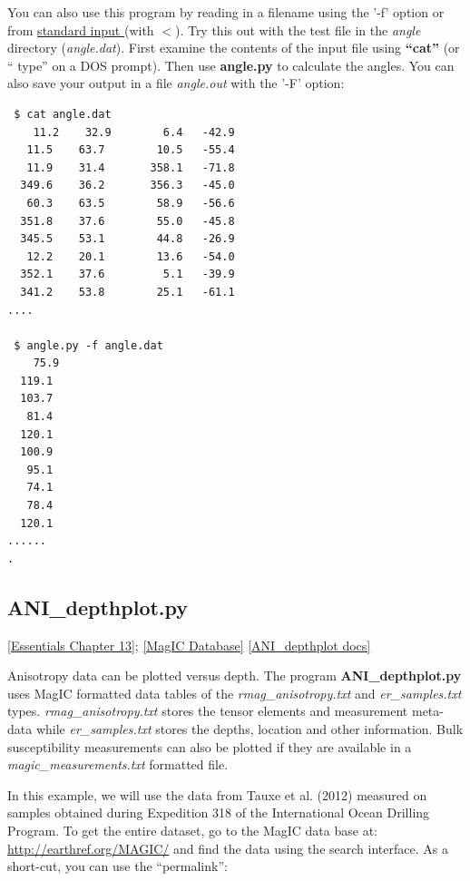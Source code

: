 \documentclass[11pt]{book}
\begin{document}
{ You can also use this program by reading in a filename using the '-f' option or from \href{#standard_IO}{standard input }(with $<$).  Try this out with the test file in the {\it angle} directory ({\it angle.dat}).  First examine the contents of the input file using {\bf ``cat''} (or `` type'' on a DOS prompt).  Then use {\bf angle.py} to calculate the angles.  You can also save your output in a file {\it angle.out} with the '-F' option:

 \begin{verbatim}
 $ cat angle.dat
    11.2    32.9 	    6.4   -42.9
   11.5    63.7 	   10.5   -55.4
   11.9    31.4 	  358.1   -71.8
  349.6    36.2 	  356.3   -45.0
   60.3    63.5 	   58.9   -56.6
  351.8    37.6 	   55.0   -45.8
  345.5    53.1 	   44.8   -26.9
   12.2    20.1 	   13.6   -54.0
  352.1    37.6 	    5.1   -39.9
  341.2    53.8 	   25.1   -61.1
....

 $ angle.py -f angle.dat
    75.9
  119.1
  103.7
   81.4
  120.1
  100.9
   95.1
   74.1
   78.4
  120.1
......
.
\end{verbatim}


\subsection{ANI\_depthplot.py}
\href{http://earthref.org/MAGIC/books/Tauxe/Essentials/WebBook3ch13.html#ch13}{[Essentials Chapter 13]};
\href{#MagICDatabase}{[MagIC Database]}
\href{https://github.com/PmagPy/PmagPy/blob/master/programs/ANI_depthplot.py}{[ANI\_depthplot docs]}

Anisotropy data can be plotted versus depth.  The program {\bf ANI\_depthplot.py} uses MagIC formatted data tables of the {\it rmag\_anisotropy.txt} and {\it er\_samples.txt} types.  {\it rmag\_anisotropy.txt} stores the tensor elements and measurement meta-data while {\it er\_samples.txt} stores the depths, location and other information.  Bulk susceptibility measurements can also be plotted if they are available in a {\it magic\_measurements.txt} formatted file.

In this example, we will use the data from Tauxe et al. (2012) \nocite{tauxe12} measured on samples obtained during Expedition 318 of the International Ocean Drilling Program.  To get the entire dataset, go to the MagIC data base at:  \url{http://earthref.org/MAGIC/}
and find the data using the search interface.   As a short-cut, you can use the ``permalink'':

}
\end{document}
